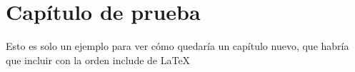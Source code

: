 %

\chapter[Capítulo de prueba]{Capítulo de prueba} 
\label{capituloPRUEBA}


Esto es solo un ejemplo para ver cómo quedaría un capítulo nuevo, que habría que incluir con la orden include de \LaTeX